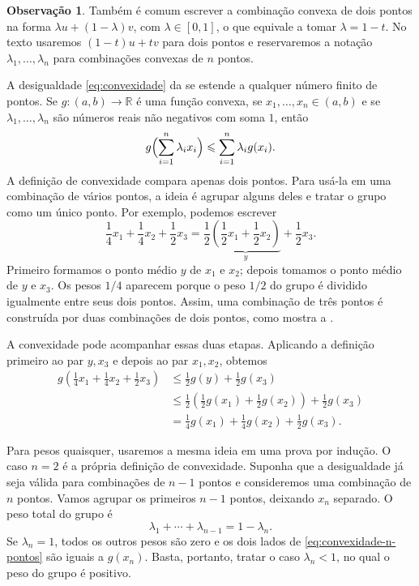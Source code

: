 \documentclass[12pt,portuguese]{article}
\theoremstyle{definition}
\newtheorem{remark}[remark]{Observação}
\theoremstyle{plainexercise}
\theoremstyle{starredexercise}
\theoremstyle{definition}
\begin{document}


\begin{remark}\label{rem:convexidade-lambda}
Também é comum escrever a combinação convexa de dois pontos na forma
$\lambda u+(1-\lambda)v$, com $\lambda\in[0,1]$, o que equivale a tomar
$\lambda=1-t$. No texto usaremos $(1-t)u+tv$ para dois pontos e reservaremos a
notação $\lambda_1,\ldots,\lambda_n$ para combinações convexas de $n$ pontos.
\end{remark}

A desigualdade \eqref{eq:convexidade} da 
se estende a qualquer número finito de pontos. Se
$g\colon(a,b)\to\mathbb{R}$ é uma função convexa, se $x_1,\ldots,x_n\in(a,b)$ e se $\lambda_1,\ldots,\lambda_n$
são números reais não negativos com soma $1$, então
\begin{equation}\label{eq:convexidade-n-pontos}
g\Bigl(\sum_{i=1}^{n}\lambda_ix_i\Bigr)
\leqslant
\sum_{i=1}^{n}\lambda_ig(x_i).
\end{equation}
A definição de convexidade compara apenas dois pontos. Para usá-la em uma
combinação de vários pontos, a ideia é agrupar alguns deles e tratar o grupo
como um único ponto. Por exemplo, podemos escrever
\[
\frac14x_1+\frac14x_2+\frac12x_3
=\frac12\underbrace{\left(\frac12x_1+\frac12x_2\right)}_{y}
+\frac12x_3.
\]
Primeiro formamos o ponto médio $y$ de $x_1$ e $x_2$; depois tomamos o ponto
médio de $y$ e $x_3$. Os pesos $1/4$ aparecem porque o peso $1/2$ do grupo
é dividido igualmente entre seus dois pontos. Assim, uma combinação de três
pontos é construída por duas combinações de dois pontos, como mostra a
.



A convexidade pode acompanhar essas duas etapas. Aplicando a definição
primeiro ao par $y,x_3$ e depois ao par $x_1,x_2$, obtemos
\[
\begin{aligned}
g\left(\frac14x_1+\frac14x_2+\frac12x_3\right)
&\leqslant\frac12g(y)+\frac12g(x_3)\\[2pt]
&\leqslant\frac12\left(\frac12g(x_1)+\frac12g(x_2)\right)
  +\frac12g(x_3)\\[2pt]
&=\frac14g(x_1)+\frac14g(x_2)+\frac12g(x_3).
\end{aligned}
\]

Para pesos quaisquer, usaremos a mesma ideia em uma prova por indução.
O caso $n=2$ é a própria definição de convexidade. Suponha que a
desigualdade já seja válida para combinações de $n-1$ pontos e consideremos
uma combinação de $n$ pontos. Vamos agrupar os primeiros $n-1$ pontos,
deixando $x_n$ separado. O peso total do grupo é
\[
\lambda_1+\cdots+\lambda_{n-1}=1-\lambda_n.
\]
Se $\lambda_n=1$, todos os outros pesos são zero e os dois lados de
\eqref{eq:convexidade-n-pontos} são iguais a $g(x_n)$. Basta, portanto,
tratar o caso $\lambda_n<1$, no qual o peso do grupo é positivo.
\end{document}
